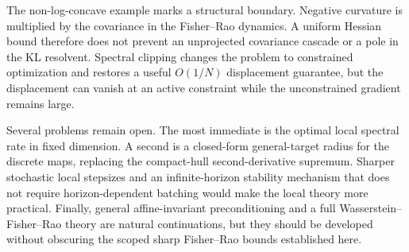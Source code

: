 The non-log-concave example marks a structural boundary.  Negative curvature
is multiplied by the covariance in the Fisher--Rao dynamics.  A uniform Hessian
bound therefore does not prevent an unprojected covariance cascade or a pole in
the KL resolvent.  Spectral clipping changes the problem to constrained
optimization and restores a useful \(O(1/N)\) displacement guarantee, but the
displacement can vanish at an active constraint while the unconstrained
gradient remains large.

Several problems remain open.  The most immediate is the optimal local spectral
rate in fixed dimension.  A second is a closed-form general-target radius for
the discrete maps, replacing the compact-hull second-derivative supremum.
Sharper stochastic local stepsizes and an infinite-horizon stability mechanism
that does not require horizon-dependent batching would make the local theory
more practical.  Finally, general affine-invariant preconditioning and a full
Wasserstein--Fisher--Rao theory are natural continuations, but they should be
developed without obscuring the scoped sharp Fisher--Rao bounds established
here.

